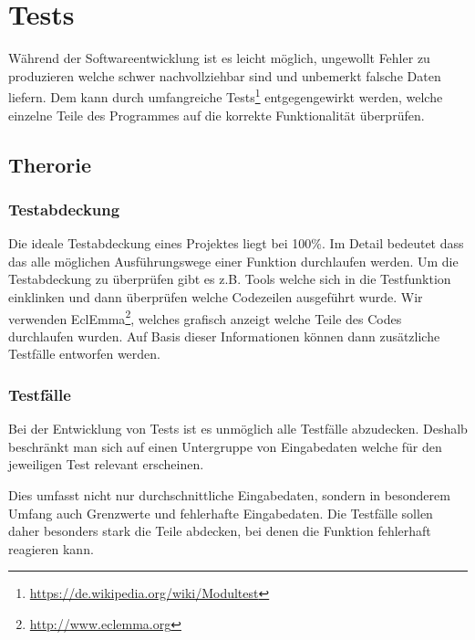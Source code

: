 

\section{Tests}

W\"ahrend der Softwareentwicklung ist es leicht m\"oglich, ungewollt Fehler zu produzieren welche schwer nachvollziehbar sind und unbemerkt falsche Daten liefern. Dem kann durch umfangreiche Tests\footnote{\url{https://de.wikipedia.org/wiki/Modultest}} entgegengewirkt werden, welche einzelne Teile des Programmes auf die korrekte Funktionalit\"at \"uberpr\"ufen.

\subsection{Therorie}

\subsubsection{Testabdeckung}

Die ideale Testabdeckung eines Projektes liegt bei 100\%. Im Detail bedeutet dass das alle m\"oglichen Ausf\"uhrungswege einer Funktion durchlaufen werden. Um die Testabdeckung zu \"uberpr\"ufen gibt es z.B. Tools welche sich in die Testfunktion einklinken und dann \"uberpr\"ufen welche Codezeilen ausgef\"uhrt wurde. Wir verwenden EclEmma\footnote{\url{http://www.eclemma.org}}, welches grafisch anzeigt welche Teile des Codes durchlaufen wurden. Auf Basis dieser Informationen k\"onnen dann zus\"atzliche Testf\"alle entworfen werden.

\subsubsection{Testf\"alle}

Bei der Entwicklung von Tests ist es unm\"oglich alle Testf\"alle abzudecken. Deshalb beschr\"ankt man sich auf einen Untergruppe von Eingabedaten welche f\"ur den jeweiligen Test relevant erscheinen.

Dies umfasst nicht nur durchschnittliche Eingabedaten, sondern in besonderem Umfang auch Grenzwerte und fehlerhafte Eingabedaten. Die Testf\"alle sollen daher besonders stark die Teile abdecken, bei denen die Funktion fehlerhaft reagieren kann.

